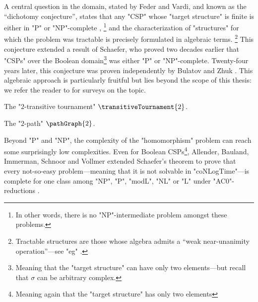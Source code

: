 A central question in the domain, stated by Feder and Vardi,
and known as the ``dichotomy conjecture'', states that any "CSP" whose "target structure" is 
finite is either in "P" or "NP"-complete
\cite[\S~2, ``Dichotomy question'']{FederVardi1998ComputationalStructure},%
\footnote{In other words, there is no "NP"-intermediate 
problem amongst these problems.} and the characterization of "structures" for which the problem
was tractable is precisely formulated in algebraic terms.%
\footnote{Tractable structures are those whose algebra admits a
``weak near-unanimity operation''---see "eg" \cite[\S~1, p.~3]{Zhuk2020CSPDichotomy}.}
This conjecture extended a result of Schaefer, who proved two decades earlier
that "CSPs" over the Boolean domain\footnote{Meaning that the "target structure" can have only two elements---but recall that $\sigma$ can be arbitrary complex.} was either "P" or "NP"-complete.
Twenty-four years later, this conjecture was proven independently by
Bulatov \cite[Theorem 1]{Bulatov2017DichotomyCSPs}
and Zhuk \cite[Theorem 1.4]{Zhuk2020CSPDichotomy}.
This algebraic approach is particularly fruitful but lies beyond
the scope of this thesis: we refer the reader to \cite{BartoKrokhinWillard2017Polymorphisms,Larose2017DigraphCSP} for surveys on the topic.

\begin{marginfigure}
	\centering
	\begin{tikzpicture}
		
	\end{tikzpicture}
	\caption{
		\AP\label{fig:T2}
		The "$2$-transitive tournament" $\transitiveTournament{2}$.
	}
\end{marginfigure}
\begin{marginfigure}
	\centering
	\begin{tikzpicture}
		
	\end{tikzpicture}
	\caption{
		\AP\label{fig:P2}
		The "$2$-path" $\pathGraph{2}$.
	}
\end{marginfigure}
Beyond "P" and "NP", the complexity of the "homomorphism" problem can reach some
surprisingly low complexities.
Even for Boolean CSPs\footnote{Meaning again that the "target structure" has only two elements},
Allender, Bauland, Immerman, Schnoor and Vollmer extended Schaefer's theorem to
prove that every not-so-easy problem---meaning that it is not solvable in "coNLogTime"---is
complete for one class among "NP", "P", "modL", "NL" or "L" under "AC0"-reductions
\cite[Theorem~3.1]{AllenderBaulandImmermanSchnoorVollmer2009Schaefer}.

